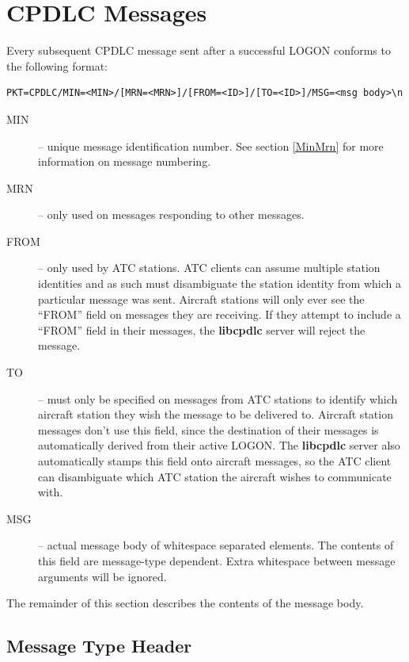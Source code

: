 \documentclass[a4paper,12pt]{article}
\newcommand{\libcpdlc}{\textbf{libcpdlc}\xspace}
\begin{document}
\section{CPDLC Messages}

Every subsequent CPDLC message sent after a successful LOGON conforms to
the following format:

\begin{verbatim}
PKT=CPDLC/MIN=<MIN>/[MRN=<MRN>]/[FROM=<ID>]/[TO=<ID>]/MSG=<msg body>\n
\end{verbatim}

\begin{description}

\item[MIN] -- unique message identification number. See section
\ref{MinMrn} for more information on message numbering.

\item[MRN] -- only used on messages responding to other messages.

\item[FROM] -- only used by ATC stations. ATC clients can assume multiple
station identities and as such must disambiguate the station identity
from which a particular message was sent. Aircraft stations will only
ever see the ``FROM'' field on messages they are receiving. If they
attempt to include a ``FROM'' field in their messages, the \libcpdlc
server will reject the message.

\item[TO] -- must only be specified on messages from ATC stations
to identify which aircraft station they wish the message to be delivered
to. Aircraft station messages don't use this field, since the destination
of their messages is automatically derived from their active LOGON. The
\libcpdlc server also automatically stamps this field onto aircraft
messages, so the ATC client can disambiguate which ATC station the
aircraft wishes to communicate with.

\item[MSG] -- actual message body of whitespace separated elements. The
contents of this field are message-type dependent. Extra whitespace
between message arguments will be ignored.

\end{description}

\noindent The remainder of this section describes the contents of the
message body.

\subsection{Message Type Header}
\end{document}
